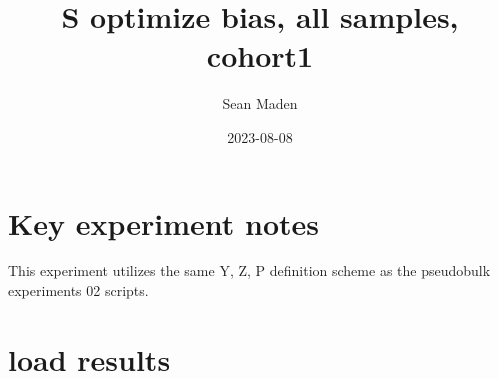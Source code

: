 \documentclass[
]{article}
\title{S optimize bias, all samples, cohort1}
\author{Sean Maden}
\date{2023-08-08}
\begin{document}
\maketitle

\hypertarget{key-experiment-notes}{%
\section{Key experiment notes}\label{key-experiment-notes}}

This experiment utilizes the same Y, Z, P definition scheme as the
pseudobulk experiments 02 scripts.

\hypertarget{load-results}{%
\section{load results}\label{load-results}}
\end{document}

